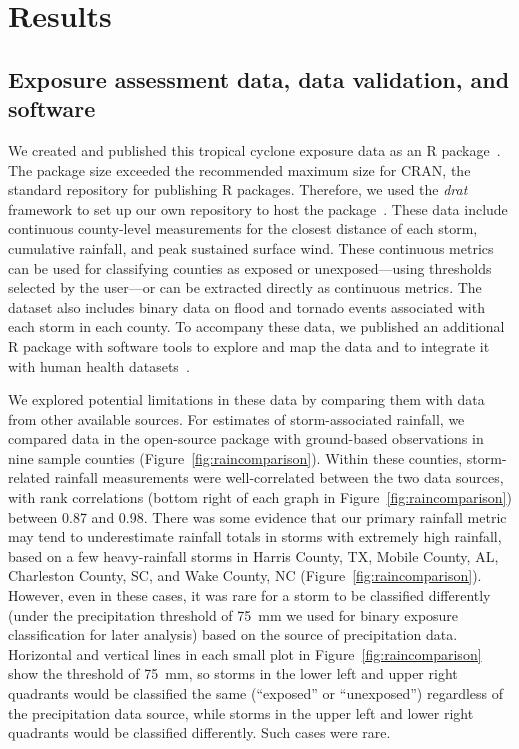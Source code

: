 \section*{Results}

\subsection*{Exposure assessment data, data validation, and software}

We created and published this tropical cyclone exposure data as an R
package~\parencite{hurricaneexposuredata}.  The package size exceeded the
recommended maximum size for \ac{CRAN}, the standard repository for publishing
R packages. Therefore, we used the \textit{drat} framework to set up our own
repository to host the package~\parencite{anderson2017hosting}. These data
include continuous county-level measurements for the closest distance of each
storm, cumulative rainfall, and peak sustained surface wind. These continuous
metrics can be used for classifying counties as exposed or unexposed---using
thresholds selected by the user---or can be extracted directly as continuous
metrics. The dataset also includes binary data on flood and tornado events
associated with each storm in each county. To accompany these data, we
published an additional R package with software tools to explore and map the
data and to integrate it with human health
datasets~\parencite{hurricaneexposure}.

We explored potential limitations in these data by comparing them with data
from other available sources.  For estimates of storm-associated rainfall, we
compared data in the open-source package with ground-based
observations in nine sample counties (Figure~\ref{fig:raincomparison}). Within
these counties, storm-related rainfall measurements were well-correlated
between the two data sources, with rank correlations (bottom right of each
graph in Figure~\ref{fig:raincomparison}) between 0.87 and 0.98. 
There was some evidence that our primary rainfall metric may tend to
underestimate rainfall totals in storms with extremely high rainfall, based on
a few heavy-rainfall storms in Harris County, TX, Mobile County, AL, Charleston
County, SC, and Wake County, NC (Figure~\ref{fig:raincomparison}). However,
even in these cases, it was rare for a storm to be classified differently
(under the precipitation threshold of 75~\si{\milli\metre} we used for binary
exposure classification for later analysis) based on the source of
precipitation data. Horizontal and vertical lines in each small plot in
Figure~\ref{fig:raincomparison} show the threshold of 75~\si{\milli\metre}, so
storms in the lower left and upper right quadrants would be classified the same
(``exposed'' or ``unexposed'') regardless of the precipitation data source,
while storms in the upper left and lower right quadrants would be classified
differently. Such cases were rare.


